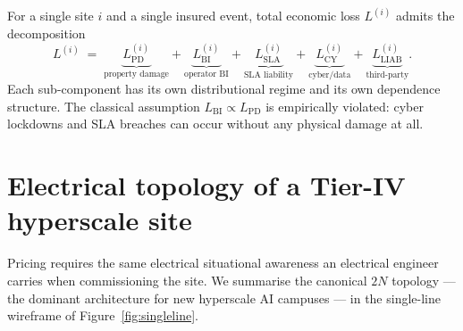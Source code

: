 \documentclass[11pt,a4paper]{article}
\let\origsection\section
\renewcommand{\section}{\clearpage\origsection}
\theoremstyle{ia}
\newcommand{\1}{\mathbf{1}}
\begin{document}
For a single site $i$ and a single insured event, total economic loss
$L^{(i)}$ admits the decomposition
\begin{equation}\label{eq:loss-decomp}
L^{(i)} \;=\; \underbrace{L^{(i)}_{\mathrm{PD}}}_{\text{property damage}}
       + \underbrace{L^{(i)}_{\mathrm{BI}}}_{\text{operator BI}}
       + \underbrace{L^{(i)}_{\mathrm{SLA}}}_{\text{SLA liability}}
       + \underbrace{L^{(i)}_{\mathrm{CY}}}_{\text{cyber/data}}
       + \underbrace{L^{(i)}_{\mathrm{LIAB}}}_{\text{third-party}} .
\end{equation}
Each sub-component has its own distributional regime and its own
dependence structure. The classical assumption $L_{\mathrm{BI}}\propto L_{\mathrm{PD}}$
is empirically violated: cyber lockdowns and SLA breaches can occur
without any physical damage at all.

\section{Electrical topology of a Tier-IV hyperscale site}\label{sec:topology}

Pricing requires the same electrical situational awareness an
electrical engineer carries when commissioning the site. We summarise
the canonical $2N$ topology --- the dominant architecture for new
hyperscale AI campuses --- in the single-line wireframe of
Figure~\ref{fig:singleline}.
\end{document}
